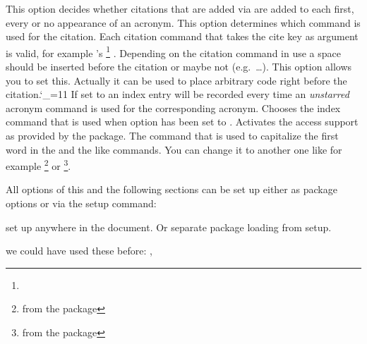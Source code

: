 \documentclass[DIV10,toc=index,toc=bib,hyperfootnotes=false]{cnpkgdoc}
\begin{document}
\begin{beschreibung}
   This option decides whether citations that are added via 
   are added to each first, every or no appearance of an acronym.
   This option determines which command is used for the citation. Each citation
   command that takes the cite key as argument is valid, for example 's%
   \footnote{} .
   Depending on the citation command in use a space should be inserted before the
   citation or maybe not (e.g.\ \ldots). This option allows you to
   set this. Actually it can be used to place arbitrary code right before the
   citation.\catcode`\_=11
   If set to  an index entry will be recorded
   every time an \emph{unstarred} acronym command is used for the corresponding
   acronym.
   Chooses the index command that is used when option 
   has been set to .
   Activates the access support as provided by the 
    package.
   The command that is used to capitalize the first word in the  and the
   like commands.  You can change it to another one like for example
   \footnote{from the  package} or
   \footnote{from the  package}.
\end{beschreibung}

All options of this and the following sections can be set up either as package
options or via the setup command:
\begin{beschreibung}
 \newline
   set up \acro anywhere in the document. Or separate package loading from setup.
\end{beschreibung}

\begin{beispiel}
 we could have used these before: \nato, \ny
\end{beispiel}
\end{document}
